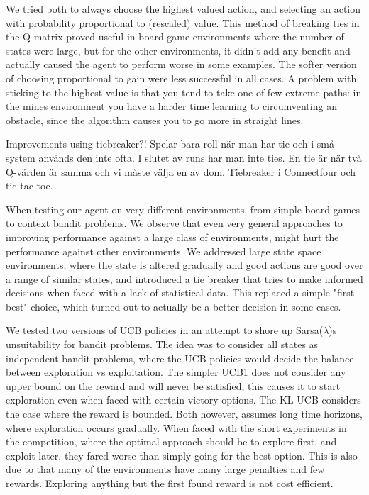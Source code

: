 We tried both to always choose
the highest valued action, and selecting an action with probability proportional
to (rescaled) value. This method of breaking ties in the Q matrix proved useful
in board game environments  where the number of states were large, but for the
other environments, it didn't add any benefit and actually caused the agent to
perform worse in some examples. The softer version of choosing proportional to
gain were less successful in all cases. A problem with sticking to the highest
value is that you tend to take one of few extreme paths: in the mines
environment you have a harder time learning to circumventing an obstacle, since
the algorithm causes you to go more in straight lines.

Improvements using tiebreaker?!
Spelar bara roll när man har tie och i små system används den inte ofta. I slutet av runs har man inte ties. En tie är när två Q-värden är samma och vi måste välja en av dom.
Tiebreaker i Connectfour och tic-tac-toe.


When testing our agent on very different environments, from simple board games to context bandit problems. We observe that even very general approaches to improving performance against a large class of environments, might hurt the performance against other environments. We addressed large state space environments, where the state is altered gradually and good actions are good over a range of similar states, and introduced a tie breaker that tries to make informed decisions when faced with a lack of statistical data. This replaced a simple "first best" choice, which turned out to actually be a better decision in some cases. 

We tested two versions of UCB policies in an attempt to shore up Sarsa($\lambda$)s unsuitability for bandit problems. The idea was to consider all states as independent bandit problems, where the UCB policies would decide the balance between exploration vs exploitation. The simpler UCB1 does not consider any upper bound on the reward and will never be satisfied, this causes it to start exploration even when faced with certain victory options. The KL-UCB considers the case where the reward is bounded. Both however, assumes long time horizons, where exploration occurs gradually. When faced with the short experiments in the competition, where the optimal approach should be to explore first, and exploit later, they fared worse than simply going for the best option. This is also due to that many of the environments have many large penalties and few rewards. Exploring anything but the first found reward is not cost efficient. 

